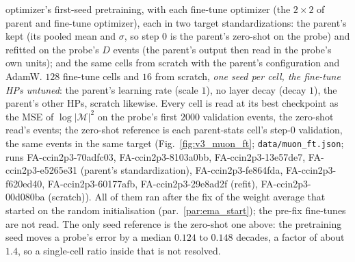 \documentclass[11pt]{article}
\newcommand{\code}[1]{\texttt{#1}}
\begin{document}
\begin{itemize}
    optimizer's first-seed pretraining, with each fine-tune optimizer (the $2\times2$ of parent and fine-tune
    optimizer), each in two target standardizations: the parent's kept (its pooled mean and $\sigma$, so step $0$ is
    the parent's zero-shot on the probe) and refitted on the probe's $D$ events (the parent's output then read in the
    probe's own units); and the same cells from scratch with the parent's configuration and AdamW. $128$ fine-tune
    cells and $16$ from scratch, \emph{one seed per cell, the fine-tune HPs untuned}: the parent's learning rate (scale
    $1$), no layer decay (decay $1$), the parent's other HPs, scratch likewise. Every cell is read at its best
    checkpoint as the MSE of $\log|\mathcal M|^2$ on the probe's first $2000$ validation events, the zero-shot read's
    events; the zero-shot reference is each parent-stats cell's step-$0$ validation, the same events in the same target
    (Fig.~\ref{fig:v3_muon_ft}; \code{data/muon\_ft.json}; runs FA-ccin2p3-70adfc03, FA-ccin2p3-8103a0bb,
    FA-ccin2p3-13e57de7, FA-ccin2p3-e5265e31 (parent's standardization), FA-ccin2p3-fe864fda, FA-ccin2p3-f620ed40,
    FA-ccin2p3-60177afb, FA-ccin2p3-29e8ad2f (refit), FA-ccin2p3-00d080ba (scratch)). All of them ran after the fix of
    the weight average that started on the random initialisation (par.~\ref{par:ema_start}); the pre-fix fine-tunes
    are not read. The only seed reference is the zero-shot one above: the pretraining seed moves a probe's error by a
    median $0.124$ to $0.148$ decades, a factor of about $1.4$, so a single-cell ratio inside that is not resolved.

\end{itemize}
\end{document}
